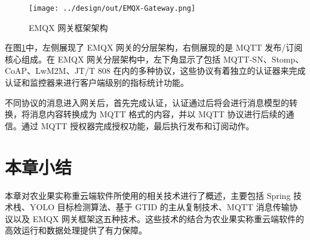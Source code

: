 \begin{figure}[H]
    \centering
    \texttt{[image: ../design/out/EMQX-Gateway.png]}
    \caption{EMQX 网关框架架构}
    \label{fig:EMQX-Gateway}
\end{figure}

在图\ref{fig:EMQX-Gateway}中，左侧展现了 EMQX 网关的分层架构，右侧展现的是 MQTT 发布/订阅核心组成。在 EMQX 网关分层架构中，左下角显示了包括 MQTT-SN、Stomp、CoAP、LwM2M、JT/T 808 在内的多种协议，这些协议有着独立的认证器来完成认证和监控器来进行客户端级别的指标统计功能。

不同协议的消息进入网关后，首先完成认证，认证通过后将会进行消息模型的转换，将消息内容转换成为 MQTT 格式的内容，并以 MQTT 协议进行后续的通信。通过 MQTT 授权器完成授权功能，最后执行发布和订阅动作。

\section{本章小结}

本章对农业果实称重云端软件所使用的相关技术进行了概述，主要包括 Spring 技术栈、YOLO 目标检测算法、基于 GTID 的主从复制技术、MQTT 消息传输协议以及 EMQX 网关框架这五种技术。这些技术的结合为农业果实称重云端软件的高效运行和数据处理提供了有力保障。
